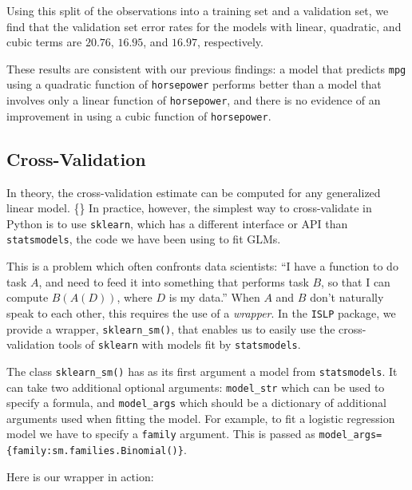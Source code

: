 \documentclass[11pt]{article}
\begin{document}
    Using this split of the observations into a training set and a
validation set, we find that the validation set error rates for the
models with linear, quadratic, and cubic terms are \(20.76\), \(16.95\),
and \(16.97\), respectively.

These results are consistent with our previous findings: a model that
predicts \texttt{mpg} using a quadratic function of \texttt{horsepower}
performs better than a model that involves only a linear function of
\texttt{horsepower}, and there is no evidence of an improvement in using
a cubic function of \texttt{horsepower}.

    \hypertarget{cross-validation}{%
\subsection{Cross-Validation}\label{cross-validation}}

In theory, the cross-validation estimate can be computed for any
generalized linear model. \{\} In practice, however, the simplest way to
cross-validate in Python is to use \texttt{sklearn}, which has a
different interface or API than \texttt{statsmodels}, the code we have
been using to fit GLMs.

This is a problem which often confronts data scientists: ``I have a
function to do task \(A\), and need to feed it into something that
performs task \(B\), so that I can compute \(B(A(D))\), where \(D\) is
my data.'' When \(A\) and \(B\) don't naturally speak to each other,
this requires the use of a \emph{wrapper}. In the \texttt{ISLP} package,
we provide a wrapper, \texttt{sklearn\_sm()}, that enables us to easily
use the cross-validation tools of \texttt{sklearn} with models fit by
\texttt{statsmodels}.

The class \texttt{sklearn\_sm()} has as its first argument a model from
\texttt{statsmodels}. It can take two additional optional arguments:
\texttt{model\_str} which can be used to specify a formula, and
\texttt{model\_args} which should be a dictionary of additional
arguments used when fitting the model. For example, to fit a logistic
regression model we have to specify a \texttt{family} argument. This is
passed as
\texttt{model\_args=\{\textquotesingle{}family\textquotesingle{}:sm.families.Binomial()\}}.

Here is our wrapper in action:
\end{document}
